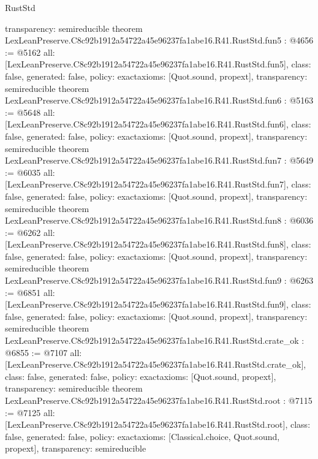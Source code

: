 \begin{lexlean}{RustStd}
\begin{coremodule}
{  transparency: semireducible
}
theorem LexLeanPreserve.C8c92b1912a54722a45e96237fa1abe16.R41.RustStd.fun5 : @4656 := @5162 {
  all: [LexLeanPreserve.C8c92b1912a54722a45e96237fa1abe16.R41.RustStd.fun5],
  class: false,
  generated: false,
  policy: exact{axioms: [Quot.sound, propext]},
  transparency: semireducible
}
theorem LexLeanPreserve.C8c92b1912a54722a45e96237fa1abe16.R41.RustStd.fun6 : @5163 := @5648 {
  all: [LexLeanPreserve.C8c92b1912a54722a45e96237fa1abe16.R41.RustStd.fun6],
  class: false,
  generated: false,
  policy: exact{axioms: [Quot.sound, propext]},
  transparency: semireducible
}
theorem LexLeanPreserve.C8c92b1912a54722a45e96237fa1abe16.R41.RustStd.fun7 : @5649 := @6035 {
  all: [LexLeanPreserve.C8c92b1912a54722a45e96237fa1abe16.R41.RustStd.fun7],
  class: false,
  generated: false,
  policy: exact{axioms: [Quot.sound, propext]},
  transparency: semireducible
}
theorem LexLeanPreserve.C8c92b1912a54722a45e96237fa1abe16.R41.RustStd.fun8 : @6036 := @6262 {
  all: [LexLeanPreserve.C8c92b1912a54722a45e96237fa1abe16.R41.RustStd.fun8],
  class: false,
  generated: false,
  policy: exact{axioms: [Quot.sound, propext]},
  transparency: semireducible
}
theorem LexLeanPreserve.C8c92b1912a54722a45e96237fa1abe16.R41.RustStd.fun9 : @6263 := @6851 {
  all: [LexLeanPreserve.C8c92b1912a54722a45e96237fa1abe16.R41.RustStd.fun9],
  class: false,
  generated: false,
  policy: exact{axioms: [Quot.sound, propext]},
  transparency: semireducible
}
theorem LexLeanPreserve.C8c92b1912a54722a45e96237fa1abe16.R41.RustStd.crate_ok : @6855 := @7107 {
  all: [LexLeanPreserve.C8c92b1912a54722a45e96237fa1abe16.R41.RustStd.crate_ok],
  class: false,
  generated: false,
  policy: exact{axioms: [Quot.sound, propext]},
  transparency: semireducible
}
theorem LexLeanPreserve.C8c92b1912a54722a45e96237fa1abe16.R41.RustStd.root : @7115 := @7125 {
  all: [LexLeanPreserve.C8c92b1912a54722a45e96237fa1abe16.R41.RustStd.root],
  class: false,
  generated: false,
  policy: exact{axioms: [Classical.choice, Quot.sound, propext]},
  transparency: semireducible
}


\end{coremodule}
\end{lexlean}

